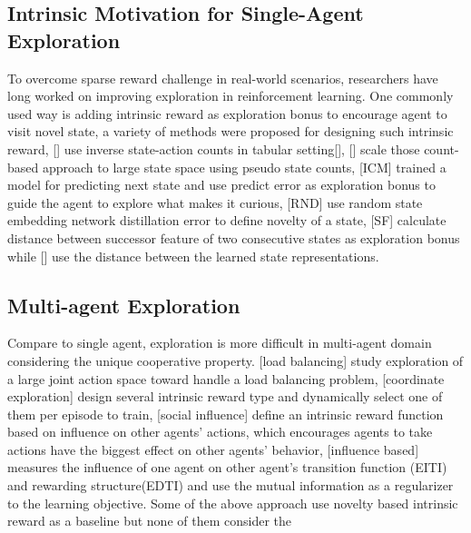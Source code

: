 \documentclass{article} %
\begin{document}
\subsection{Intrinsic Motivation for Single-Agent Exploration}
To overcome sparse reward challenge in real-world scenarios, researchers have long worked on improving exploration in reinforcement learning. One commonly used way is adding intrinsic reward as exploration bonus to encourage agent to visit novel state, a variety of methods were proposed for designing such intrinsic reward, [] use inverse state-action counts in tabular setting[], [] scale those count-based approach to large state space using pseudo state counts, [ICM] trained a model for predicting next state and use predict error as exploration bonus to guide the agent to explore what makes it curious, [RND] use random state embedding network distillation error to define novelty of a state, [SF] calculate distance between successor feature of two consecutive states as exploration bonus while [] use the distance between the learned state representations. 

\subsection{Multi-agent Exploration}
Compare to single agent, exploration is more difficult in multi-agent domain considering the unique cooperative property. [load balancing] study exploration of a large joint action space toward handle a load balancing problem, [coordinate exploration] design several intrinsic reward type and dynamically select one of them per episode to train, [social influence] define an intrinsic reward function based on influence on other agents' actions, which encourages agents to take actions have the biggest effect on other agents’ behavior, [influence based] measures the influence of one agent on other agent's transition function (EITI) and rewarding structure(EDTI) and use the mutual information as a regularizer to the learning objective. Some of the above approach use novelty based intrinsic reward as a baseline but none of them consider the 
\end{document}
